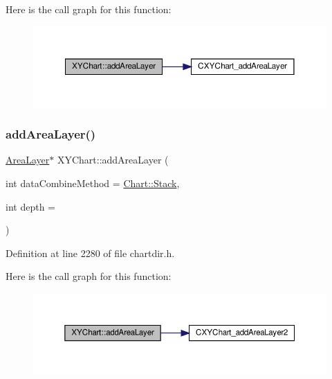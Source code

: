Here is the call graph for this function\+:
\nopagebreak
\begin{figure}[H]
\begin{center}
\leavevmode
\includegraphics[width=350pt]{class_x_y_chart_a3e5ffb6b63ea2705ac0a84518a3462fd_cgraph}
\end{center}
\end{figure}
\mbox{\label{class_x_y_chart_a06f04cbe6bc527cf1c00a24188cd7dab}} 
\subsubsection{\texorpdfstring{add\+Area\+Layer()}{addAreaLayer()}\hspace{0.1cm}{\footnotesize\ttfamily [3/3]}}
{\footnotesize\ttfamily \hyperlink{class_area_layer}{Area\+Layer}$\ast$ X\+Y\+Chart\+::add\+Area\+Layer (\begin{DoxyParamCaption}\item[{int}]{data\+Combine\+Method = {\ttfamily \hyperlink{namespace_chart_af7052bb2fea3a81e43d3812503b3b779aaf9482d7a5b2b98ba5660492356d153a}{Chart\+::\+Stack}},  }\item[{int}]{depth = {} }\end{DoxyParamCaption})\hspace{0.3cm}{\ttfamily [inline]}}



Definition at line 2280 of file chartdir.\+h.

Here is the call graph for this function\+:
\nopagebreak
\begin{figure}[H]
\begin{center}
\leavevmode
\includegraphics[width=350pt]{class_x_y_chart_a06f04cbe6bc527cf1c00a24188cd7dab_cgraph}
\end{center}
\end{figure}
\mbox{\label{class_x_y_chart_a90c3eb8c1597a2f50e63e84555d51a22}} 
